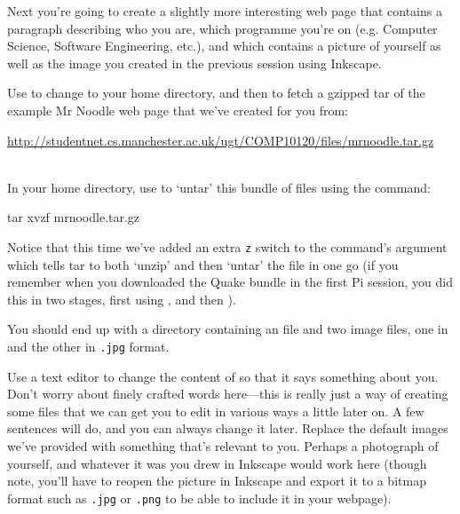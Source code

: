Next you're going to create a slightly more interesting web page that contains a paragraph describing who you are, which programme you're on (e.g. Computer Science, Software Engineering, etc.), and which contains a picture of yourself as well as the image you created in the previous session using Inkscape.

Use  to change to your home directory, and then  to fetch a gzipped tar of the example Mr Noodle web page that we've created for you from:
\\

{\small

\url{http://studentnet.cs.manchester.ac.uk/ugt/COMP10120/files/mrnoodle.tar.gz} 
}
\\

In your home directory, use  to `untar' this bundle of files using the command:

\begin{ttoutenv}
tar xvzf mrnoodle.tar.gz
\end{ttoutenv}

Notice that this time we've added an extra \texttt{z} switch to the  command's argument which tells tar to both `unzip' and then `untar' the file in one go (if you remember when you downloaded the Quake bundle in the first Pi session, you did this in two stages, first using , and then ).

You should end up with a  directory containing an  file and two image files, one in  and the other in \texttt{.jpg} format. 

Use a text editor to change the content of  so that it says something about you. Don't worry about finely crafted words here---this is really just a way of creating some files that we can get you to edit in various ways a little later on. A few sentences will do, and you can always change it later. Replace the default images we've provided with something that's relevant to you. Perhaps a photograph of yourself, and whatever it was you drew in Inkscape would work here (though note, you'll have to reopen the picture in Inkscape and export it to a bitmap format such as \texttt{.jpg} or \texttt{.png} to be able to include it in your webpage).

